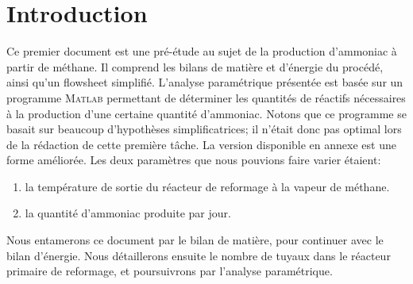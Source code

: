 \section{Introduction}

Ce premier document est une pré-étude au sujet de la production d'ammoniac à partir de méthane. 
Il comprend les bilans de matière et d'énergie du procédé, ainsi qu'un flowsheet simplifié. L'analyse paramétrique 
présentée est basée sur un programme \textsc{Matlab} permettant de déterminer les quantités de réactifs nécessaires
à la production d'une certaine quantité d'ammoniac. Notons que ce programme se basait sur beaucoup d'hypothèses 
simplificatrices; il n'était donc pas optimal lors de la rédaction de cette première tâche. La version disponible en annexe
est une forme améliorée.
Les deux paramètres que nous pouvions faire varier étaient:

\begin{enumerate}
\item la température de sortie du réacteur de reformage à la vapeur de méthane.
\item la quantité d'ammoniac  produite par jour.
\end{enumerate}


Nous entamerons ce document par le bilan de matière, pour continuer avec le bilan d'énergie. Nous détaillerons ensuite le nombre de tuyaux
dans le réacteur primaire de reformage, et poursuivrons par l'analyse paramétrique. 
